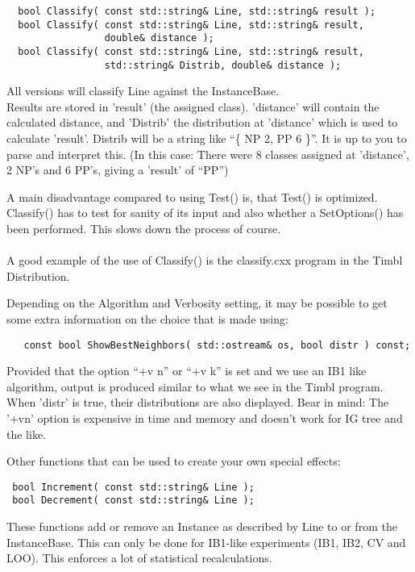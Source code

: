 \begin{verbatim}
  bool Classify( const std::string& Line, std::string& result );
  bool Classify( const std::string& Line, std::string& result, 
                 double& distance );
  bool Classify( const std::string& Line, std::string& result,
                 std::string& Distrib, double& distance );
\end{verbatim}

All versions will classify Line against the InstanceBase.\\
Results are stored in 'result' (the assigned class). 'distance' will
contain the calculated distance, and 'Distrib' the distribution at
'distance' which is used to calculate 'result'.
Distrib will be a string like ``\{ NP 2, PP 6 \}''. It is up to you to
parse and interpret this. (In this case: There were 8 classes assigned
at 'distance', 2 NP's and 6 PP's, giving a 'result' of ``PP'')

A main disadvantage compared to using Test() is, that Test() is optimized.
Classify() has to test for sanity of its input and also whether a
SetOptions() has been performed. This slows down the process of
course. \\
\ \\
A good example of the use of Classify() is the classify.cxx program in
the Timbl Distribution.

Depending on the Algorithm and Verbosity setting, it may be possible
to get some extra information on the choice that is made using:\\
\begin{verbatim}
   const bool ShowBestNeighbors( std::ostream& os, bool distr ) const;
\end{verbatim}

Provided that the option ``+v n'' or ``+v k'' is set and we use an IB1 like
algorithm, output is produced similar to what we see in the Timbl program.
When 'distr' is true, their distributions are also displayed.
Bear in mind: The '+vn' option is expensive in time and memory and
doesn't work for IG tree and the like.

Other functions that can be used to create your own special effects:

\begin{verbatim}
 bool Increment( const std::string& Line ); 
 bool Decrement( const std::string& Line ); 
\end{verbatim}

These functions add or remove an Instance as described by Line to or
from the InstanceBase.
This can only be done for IB1-like experiments (IB1, IB2, CV and LOO).
This enforces a lot of statistical recalculations.

